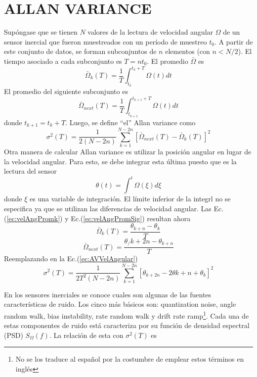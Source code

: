 \documentclass[a4paper,11pt,twoside]{IT-CNEA}
\begin{document}
\section{ALLAN VARIANCE}
Supóngase que se tienen $N$ valores de la lectura de velocidad angular $\Omega$ de un sensor inercial que fueron muestreados con un período de muestreo $t_0$. A partir de este conjunto de datos, se forman subconjuntos de $n$ elementos (con $n<N/2$). El tiempo asociado a cada subconjunto es $T=nt_0$. El promedio $\bar{\Omega}$ es
\begin{equation}
\bar{\Omega}_k(T)=\frac{1}{T}\int_{t_k}^{t_k+T}\Omega(t)dt
\label{ec:velAngPromk}
\end{equation}
El promedio del siguiente subconjunto es
\begin{equation}
\bar{\Omega}_{next}(T)=\frac{1}{T}\int_{t_{k+1}}^{t_{k+1}+T}\Omega(t)dt
\label{ec:velAngPromSig}
\end{equation}
donde $t_{k+1}=t_k+T$. Luego, se define ``el'' Allan variance como
\begin{equation}
\sigma^2(T)=\frac{1}{2\left( N-2n\right)}\sum_{k=1}^{N-2n}\left[\bar{\Omega}_{next}(T)- \bar{\Omega}_k(T)\right]^2
\label{ec:AVVelAngular}
\end{equation}
Otra manera de calcular Allan variance es utilizar la posición angular en lugar de la velocidad angular. Para esto, se debe integrar esta última puesto que es la lectura del sensor
\begin{equation}
\theta(t)=\int^t\Omega(\xi)d\xi
\end{equation}
donde $\xi$ es una variable de integración. El límite inferior de la integrl no se especifica ya que se utilizan las diferencias de velocidad angular. Las Ec.(\ref{ec:velAngPromk}) y Ec.(\ref{ec:velAngPromSig}) resultan ahora
\begin{equation}
\bar{\Omega}_{k}(T)=\frac{\theta_{k+n}-\theta_k}{T}
\end{equation}
\begin{equation}
\bar{\Omega}_{next}(T)=\frac{\theta_/{k+2n}-\theta_{k+n}}{T}
\end{equation}
Reemplazando en la Ec.(\ref{ec:AVVelAngular})
\begin{equation}
\sigma^2(T)=\frac{1}{2T^2\left( N-2n\right)}\sum_{k=1}^{N-2n}\left[ \theta_{k+2n}-2\theta{k+n}+\theta_k \right]^2
\label{ec:AVPosAngular}
\end{equation}
\par En los sensores inerciales se conoce cuales son algunas de las fuentes características de ruido. Los cinco más básicos son: quantization noise, angle random walk, bias instability, rate random walk y drift rate ramp\footnote{No se los traduce al español por la costumbre de emplear estos términos en inglés}. Cada una de estas componentes de ruido está caracteriza por su función de densidad espectral (PSD) $S_{\Omega}(f)$. La relación de esta con $\sigma^2(T)$  es
\end{document}
